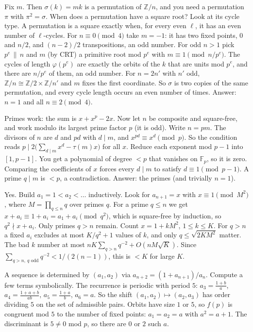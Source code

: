 \documentclass[11pt,a4paper]{article}
\begin{document}

 Fix $m$. Then $\sigma(k)=mk$ is a permutation of $\mathbb Z/n$, and you need a permutation $\pi$ with $\pi^2=\sigma$. When does a permutation have a square root? Look at its cycle type.
 A permutation is a square exactly when, for every even $\ell$, it has an even number of $\ell$-cycles. For $n\equiv0\pmod 4$ take $m=-1$: it has two fixed points, $0$ and $n/2$, and $(n-2)/2$ transpositions, an odd number. For odd $n>1$ pick $p^e\,\|\,n$ and $m$ (by CRT) a primitive root mod $p^e$ with $m\equiv1\pmod{n/p^e}$. The cycles of length $\varphi(p^e)$ are exactly the orbits of the $k$ that are units mod $p^e$, and there are $n/p^e$ of them, an odd number.
 For $n=2n'$ with $n'$ odd, $\mathbb Z/n\cong\mathbb Z/2\times\mathbb Z/n'$ and $m$ fixes the first coordinate. So $\sigma$ is two copies of the same permutation, and every cycle length occurs an even number of times. Answer: $n=1$ and all $n\equiv2\pmod 4$.

 Primes work: the sum is $x+x^p-2x$. Now let $n$ be composite and square-free, and work modulo its largest prime factor $p$ (it is odd). Write $n=pm$.
 The divisors of $n$ are $d$ and $pd$ with $d\mid m$, and $x^{pd}\equiv x^d\pmod p$. So the condition reads $p\mid 2\bigl(\sum_{d\mid m}x^d-\tau(m)x\bigr)$ for all $x$.
 Reduce each exponent mod $p-1$ into $[1,p-1]$. You get a polynomial of degree $<p$ that vanishes on $\mathbb F_p$, so it is zero. Comparing the coefficients of $x$ forces every $d\mid m$ to satisfy $d\equiv1\pmod{p-1}$. A prime $q\mid m$ is $<p$, a contradiction. Answer: the primes (and trivially $n=1$).

 Yes. Build $a_1=1<a_2<\dots$ inductively. Look for $a_{n+1}=x$ with $x\equiv1\pmod{M^2}$, where $M=\prod_{q\le n}q$ over primes $q$.
 For a prime $q\le n$ we get $x+a_i\equiv 1+a_i=a_1+a_i\pmod{q^2}$, which is square-free by induction, so $q^2\nmid x+a_i$. Only primes $q>n$ remain.
 Count $x=1+kM^2$, $1\le k\le K$. For $q>n$ a fixed $a_i$ excludes at most $K/q^2+1$ values of $k$, and only $q\le\sqrt{2KM^2}$ matter. The bad $k$ number at most $nK\sum_{q>n}q^{-2}+O(n M\sqrt K)$. Since $\sum_{q>n,\ q\text{ odd}}q^{-2}<1/(2(n-1))$, this is $<K$ for large $K$.

 A sequence is determined by $(a_1,a_2)$ via $a_{n+2}=(1+a_{n+1})/a_n$. Compute a few terms symbolically.
 The recurrence is periodic with period $5$: $a_3=\frac{1+b}{a}$, $a_4=\frac{1+a+b}{ab}$, $a_5=\frac{1+a}{b}$, $a_6=a$. So the shift $(a_1,a_2)\mapsto(a_2,a_3)$ has order dividing $5$ on the set of admissible pairs.
 Orbits have size $1$ or $5$, so $f(p)$ is congruent mod $5$ to the number of fixed points: $a_1=a_2=a$ with $a^2=a+1$. The discriminant is $5\ne0$ mod $p$, so there are $0$ or $2$ such $a$.
\end{document}
